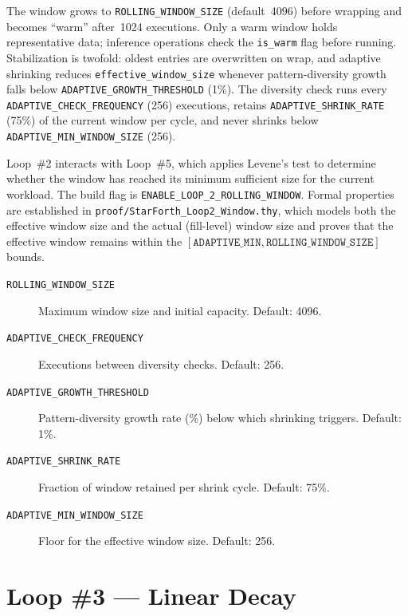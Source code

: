 The window grows to \texttt{ROLLING\_WINDOW\_SIZE} (default~4096) before
wrapping and becomes ``warm'' after~1024 executions. Only a warm window holds
representative data; inference operations check the \texttt{is\_warm} flag
before running. Stabilization is twofold: oldest entries are overwritten on
wrap, and adaptive shrinking reduces \texttt{effective\_window\_size} whenever
pattern-diversity growth falls below \texttt{ADAPTIVE\_GROWTH\_THRESHOLD}
(1\%). The diversity check runs every \texttt{ADAPTIVE\_CHECK\_FREQUENCY}
(256) executions, retains \texttt{ADAPTIVE\_SHRINK\_RATE} (75\%) of the
current window per cycle, and never shrinks below
\texttt{ADAPTIVE\_MIN\_WINDOW\_SIZE} (256).

Loop~\#2 interacts with Loop~\#5, which applies Levene's test to determine
whether the window has reached its minimum sufficient size for the current
workload. The build flag is \texttt{ENABLE\_LOOP\_2\_ROLLING\_WINDOW}. Formal
properties are established in \texttt{proof/StarForth\_Loop2\_Window.thy},
which models both the effective window size and the actual (fill-level) window
size and proves that the effective window remains within the
$[\texttt{ADAPTIVE\_MIN}, \texttt{ROLLING\_WINDOW\_SIZE}]$ bounds.

\begin{description}
  \item[\texttt{ROLLING\_WINDOW\_SIZE}] Maximum window size and initial
    capacity. Default: 4096.
  \item[\texttt{ADAPTIVE\_CHECK\_FREQUENCY}] Executions between diversity
    checks. Default: 256.
  \item[\texttt{ADAPTIVE\_GROWTH\_THRESHOLD}] Pattern-diversity growth rate
    (\%) below which shrinking triggers. Default: 1\%.
  \item[\texttt{ADAPTIVE\_SHRINK\_RATE}] Fraction of window retained per
    shrink cycle. Default: 75\%.
  \item[\texttt{ADAPTIVE\_MIN\_WINDOW\_SIZE}] Floor for the effective window
    size. Default: 256.
\end{description}

\section{Loop \#3 --- Linear Decay}
\label{vol1:sec:physics:loop3}


